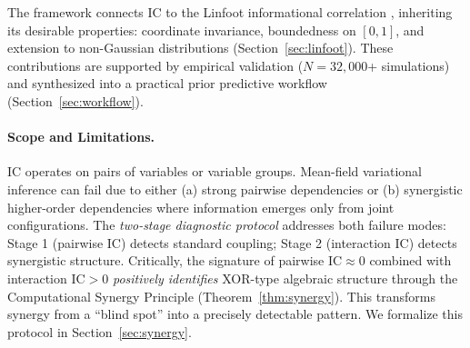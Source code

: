 \documentclass[10pt]{article} %
\theoremstyle{plain}
\theoremstyle{definition}
\newcommand{\IC}{\mathrm{IC}}  %
\begin{document}
The framework connects IC to the Linfoot informational correlation \citep{linfoot1957informational}, inheriting its desirable properties: coordinate invariance, boundedness on $[0,1]$, and extension to non-Gaussian distributions (Section~\ref{sec:linfoot}). These contributions are supported by empirical validation ($N = 32{,}000$+ simulations) and synthesized into a practical prior predictive workflow (Section~\ref{sec:workflow}).

\paragraph{Scope and Limitations.} IC operates on pairs of variables or variable groups. Mean-field variational inference can fail due to either (a) strong pairwise dependencies or (b) synergistic higher-order dependencies where information emerges only from joint configurations. The \emph{two-stage diagnostic protocol} addresses both failure modes: Stage 1 (pairwise IC) detects standard coupling; Stage 2 (interaction IC) detects synergistic structure. Critically, the signature of pairwise $\IC \approx 0$ combined with interaction $\IC > 0$ \emph{positively identifies} XOR-type algebraic structure through the Computational Synergy Principle (Theorem~\ref{thm:synergy}). This transforms synergy from a ``blind spot'' into a precisely detectable pattern. We formalize this protocol in Section~\ref{sec:synergy}.
\end{document}

